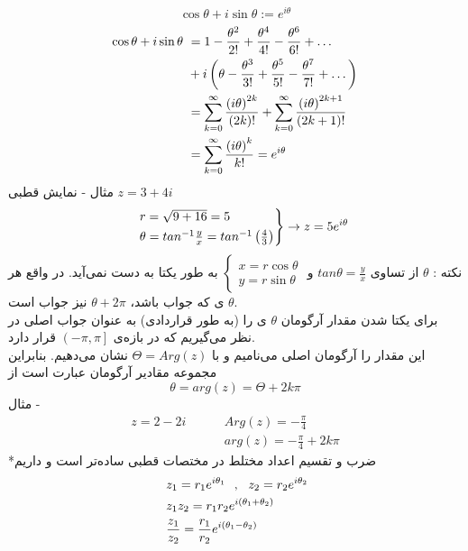 \[
\cos \theta+i\sin\theta:=e^{i\theta}
\]
\begin{equation*}
	\begin{aligned}
		\cos\theta+i\sin\theta &\ =
		1-\frac{\theta^2}{2!}+\frac{\theta^4}{4!}-\frac{\theta^6}{6!}+\dots
		\\ &\
		+i\left(\theta-\frac{\theta^3}{3!}+\frac{\theta^5}{5!}-\frac{\theta^7}{7!}+\dots\right)
		\\ &\
		=\sum_{k=0}^{\infty}\frac{\left(i\theta\right)^{2k}}{\left(2k\right)!}+\sum_{k=0}^\infty \frac{\left(i\theta\right)^{2k+1}}{\left(2k+1\right)!}
		\\ &\
		=\sum_{k=0}^\infty \frac{\left(i\theta\right)^k}{k!}=e^{i\theta}
	\end{aligned}
\end{equation*}
مثال - نمایش قطبی
$z=3+4i$
\begin{equation*}
		\begin{rcases}
		&\ r=\sqrt{9+16}=5
		\\ &\
		\theta=tan^{-1} \frac{y}{x}=tan^{-1} \left(\frac43\right)
		\end{rcases}\rightarrow z = 5e^{i\theta}
\end{equation*}
نکته :
$\theta$
از تساوی
$tan \theta=\frac{y}{x}$
و
$\begin{cases}
	x=r\cos\theta \\ y=r\sin\theta
\end{cases}$
به طور یکتا به دست نمی‌آید. در واقع هر
$\theta$
ی که جواب باشد،
$\theta+2\pi$
نیز جواب است.\\
برای یکتا شدن مقدار آرگومان
$\theta$
ی را (به طور قراردادی) به عنوان جواب اصلی در نظر می‌گیریم که در بازه‌ی
$\left(-\pi,\pi\right]$
قرار دارد.\\
این مقدار را آرگومان اصلی می‌نامیم و با
$\Theta=Arg(z)$
نشان می‌دهیم. بنابراین مجموعه مقادیر آرگومان عبارت است از
\[
\theta=arg(z)=\Theta+2k\pi
\]
مثال -
\begin{equation*}
	\begin{aligned}
		z=2-2i \qquad &\ Arg(z)=-\frac{\pi}{4}
		\\ &\
		arg(z)=-\frac\pi4+2k\pi
	\end{aligned}
\end{equation*}
*ضرب و تقسیم اعداد مختلط در مختصات قطبی ساده‌تر است و داریم
\begin{equation*}
	\begin{aligned}
		&\ z_1=r_1e^{i\theta_1} \ \ , \ \ z_2=r_2e^{i\theta_2}
		\\ &\
		z_1z_2=r_1r_2e^{i\left(\theta_1+\theta_2\right)}
		\\ &\
		\frac{z_1}{z_2}=\frac{r_1}{r_2}e^{i\left(\theta_1-\theta_2\right)}
	\end{aligned}
\end{equation*}
